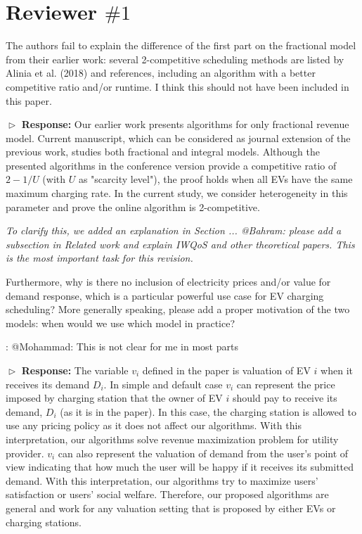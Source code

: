 \documentclass[11pt]{article}
\begin{document}
\section{Reviewer $\# 1$}

{\color{blue} The authors fail to explain the difference of the first part on the fractional model from their earlier work: several 2-competitive scheduling methods are listed by Alinia et al. (2018) and references, including an algorithm with a better competitive ratio and/or runtime. I think this should not have been included in this paper. }
\vspace{3mm}

$\vartriangleright$ \noindent\textbf{Response:} 
Our earlier work presents algorithms for only fractional revenue model. Current manuscript, which can be considered as journal extension of the previous work, studies both fractional and integral models. Although the presented algorithms in the conference version provide a competitive ratio of $2-1/U$ (with $U$ as "scarcity level"), the proof holds when all EVs have the same maximum charging rate. In the current study, we consider heterogeneity in this parameter and prove the online algorithm is 2-competitive.

\textit{To clarify this, we added an explanation in Section ...   @Bahram: please add a subsection in Related work and explain IWQoS and other theoretical papers. This is the most important task for this revision. }

\vspace{3mm}
{\color{blue} Furthermore, why is there no inclusion of electricity prices and/or value for demand response, which is a particular powerful use case for EV charging scheduling? More generally speaking, please add a proper motivation of the two models: when would we use which model in practice? }
\vspace{3mm}

{\color{red}: @Mohammad: This is not clear for me in most parts} 

$\vartriangleright$ \noindent\textbf{Response:} 
The variable $v_i$ defined in the paper is valuation of EV $i$ when it receives its demand $D_i$. In simple and default case $v_i$ can represent the price imposed by charging station that the owner of EV $i$ should pay to receive its demand, $D_i$ (as it is in the paper). In this case, the charging station is allowed to use any pricing policy as it does not affect our algorithms. With this interpretation, our algorithms solve revenue maximization problem for utility provider. $v_i$ can also represent the valuation of demand from the user's point of view indicating that how much the user will be happy if it receives its submitted demand. With this interpretation, our algorithms try to maximize users' satisfaction or users' social welfare. Therefore, our proposed algorithms are general and work for any valuation setting that is proposed by either EVs or charging stations.
	
\end{document}
